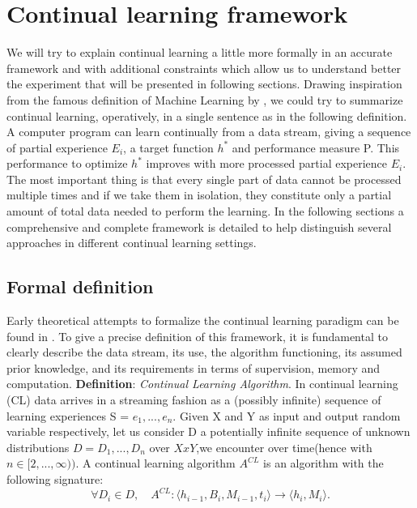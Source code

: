 \documentclass[english, LaM, oneside]{sapthesis}%
\begin{document}
\chapter{Continual learning framework}
\label{chap:3}
We will try to explain continual learning a little more formally in an accurate framework and with additional constraints which allow us to understand better the experiment that will be presented in following sections.
Drawing inspiration from the famous definition of Machine Learning by \cite{michalski}, we could try to summarize continual learning, operatively, in a single sentence as in the following definition.
\newline \newline
A computer program can learn continually from a data stream, giving a sequence of partial experience $E_i$, a target function $h^\ast$ and performance measure P. This performance to optimize $h^\ast$ improves with more processed partial experience $E_i$.
The most important thing is that every single part of data cannot be processed multiple times and if we take them in isolation, they constitute only a partial amount of total data needed to perform the learning.
\newline \newline
In the following sections a comprehensive and complete framework is detailed to help distinguish several approaches in different continual learning settings.
\section{Formal definition}
Early theoretical attempts to formalize the continual learning paradigm can be found in \cite{ring-2005}. 
To give a precise definition of this framework, it is fundamental to clearly describe the data stream, its use, the algorithm functioning, its assumed prior knowledge, and its requirements in terms of supervision, memory and computation.
\newline \newline
\textbf{Definition}: \textit{Continual Learning Algorithm}. In continual learning (CL) data arrives in a streaming fashion as a (possibly infinite) sequence of learning experiences S = $e_1, ..., e_n$. Given X and Y as input and output random variable respectively, let us consider D a potentially infinite sequence of unknown distributions $D={D_1,...,D_n}$ over $X x Y$,we encounter over time(hence with $ n∈[2,...,\infty))$. A continual learning algorithm $A^{CL}$ is an algorithm with the following signature:
\begin{equation}
                \forall D_i\in D, \quad    A^{CL} : \langle h_{i-1}, B_i, M_{i-1}, t_i \rangle \rightarrow  \langle h_i, M_i \rangle. 
\end{equation}
\end{document}
